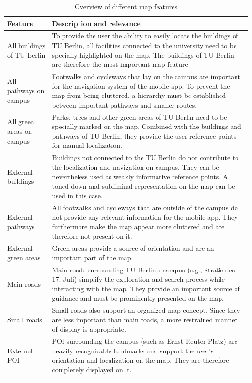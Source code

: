 \begin{longtable}{|p{1.0in}|p{5.0in}|}
    \hline
    Feature & Description and relevance \\
    \hline
    All buildings of TU Berlin & To provide the user the ability to easily locate the buildings of TU Berlin, all facilities connected to the university need to be specially highlighted on the map. The buildings of TU Berlin are therefore the most important map feature.\\
    \hline
    All pathways on campus & Footwalks and cycleways that lay on the campus are important for the navigation system of the mobile app. To prevent the map from being cluttered, a hierarchy must be established between important pathways and smaller routes. \\
    \hline
    All green areas on campus & Parks, trees and other green areas of TU Berlin need to be specially marked on the map. Combined with the buildings and pathways of TU Berlin, they provide the user reference points for manual localization. \\
    \hline
    External buildings & Buildings not connected to the TU Berlin do not contribute to the localization and navigation on campus. They can be nevertheless used as weakly informative reference points. A toned-down and subliminal representation on the map can be used in this case. \\
    \hline
    External pathways & All footwalks and cycleways that are outside of the campus do not provide any relevant information for the mobile app. They furthermore make the map appear more cluttered and are therefore not present on it. \\
    \hline
    External green areas & Green areas provide a source of orientation and are an important part of the map. \\
    \hline
    Main roads & Main roads surrounding TU Berlin's campus (e.g., Straße des 17. Juli) simplify the exploration and search process while interacting with the map. They provide an important source of guidance and must be prominently presented on the map. \\
    \hline
    Small roads & Small roads also support an organized map concept. Since they are less important than main roads, a more restrained manner of display is appropriate. \\
    \hline
    External POI & POI surrounding the campus (such as Ernst-Reuter-Platz) are heavily recognizable landmarks and support the user's orientation and localization on the map. They are therefore completely displayed on it. \\
    \hline
    \caption {Overview of different map features}
\end{longtable}

